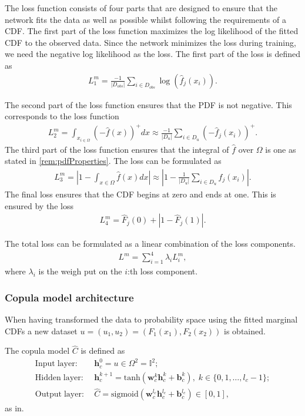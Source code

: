 The loss function consists of four parts that are designed to ensure that the network fits the data as well as possible whilst following the requirements of a \gls{CDF}. The first part of the loss function maximizes the log likelihood of the fitted \gls{CDF} to the observed data. Since the network minimizes the loss during training, we need the negative log likelihood as the loss. The first part of the loss is defined as 
\begin{align*}
    L_1^m = \frac{-1}{|D_{obs}|} \sum_{i \in D_{obs}} \log(\hat{f}_j(x_i)).
\end{align*}

The second part of the loss function ensures that the \gls{PDF} is not negative. This corresponds to the loss function 
\begin{align*}
    L_2^m = \int_{x_{i\in\Omega}} (-\hat{f}(x))^+dx \approx \frac{-1}{|D_{u}|} \sum_{i \in D_{u}} (-\hat{f}_j(x_i))^+.
\end{align*}
The third part of the loss function ensures that the integral of $\hat{f}$ over $\Omega$ is one as stated in \cref{rem:pdfProperties}. The loss can be formulated as 
\begin{align*}
    L_3^m = \left | 1- \int_{x\in \Omega} \hat{f}(x) dx    \right | \approx \left | 1- \frac{1}{|D_{u}|} \sum_{i \in D_{u}} \hat{f}_j(x_i)  \right |.
\end{align*}
The final loss ensures that the \gls{CDF} begins at zero and ends at one. This is ensured by the loss
\begin{align*}
    L_4^m = \hat{F}_j(0) + |1- \hat{F}_j(1) |.
\end{align*}

The total loss can be formulated as a linear combination of the loss components. 
\begin{align*}
    L^m = \sum_{i=1}^4 \lambda_i L_i^m,
\end{align*}
where $\lambda_i$ is the weigh put on the $i$:th loss component. 

\subsubsection{Copula model architecture} 
When having transformed the data to probability space using the fitted marginal \gls{CDF}s a new dataset $u = (u_1,u_2) = (F_1(x_1), F_2(x_2))$ is obtained. 

The copula model $\hat{C}$ is defined as 
\begin{align*}
    \mathrm{Input\;layer:} \; & \mathbf{h}_c^0 = u \in \Omega^2 = \mathbb{I}^2; \\
    \mathrm{Hidden\;layer:} \; & \mathbf{h}_c^{k+1} = \mathrm{tanh}(\mathbf{w}_c^{k} \mathbf{h}_c^{k} + \mathbf{b}_c^{k}), \; k \in \{0,1, \dots, l_c -1 \};\\
    \mathrm{Output\;layer:} \; & \hat{C} = \mathrm{sigmoid}(\mathbf{w}_c^{l_c} \mathbf{h}_c^{l_c} + \mathbf{b}_c^{l_c}) \in \left[0,1 \right],
\end{align*}
as in.

